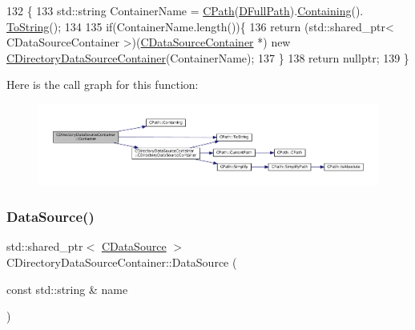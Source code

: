 \begin{DoxyCode}
132                                                                               \{
133     std::string ContainerName = \hyperlink{classCPath}{CPath}(\hyperlink{classCDirectoryDataSourceContainer_ac3d3c7e7d7bc9f68ba8a8747a3dee8b5}{DFullPath}).\hyperlink{classCPath_a24d8c455b1663ce251d3a749437fa4fe}{Containing}().
      \hyperlink{classCPath_abbafaf377a7e38e0151bd9567d526951}{ToString}();
134     
135     \textcolor{keywordflow}{if}(ContainerName.length())\{
136         \textcolor{keywordflow}{return} (std::shared\_ptr< CDataSourceContainer >)(\hyperlink{classCDataSourceContainer}{CDataSourceContainer} *) \textcolor{keyword}{new} 
      \hyperlink{classCDirectoryDataSourceContainer_a62ef6d44201c6be66421b6c247f3b3bf}{CDirectoryDataSourceContainer}(ContainerName);
137     \}
138     \textcolor{keywordflow}{return} \textcolor{keyword}{nullptr};
139 \}
\end{DoxyCode}
Here is the call graph for this function\+:
\nopagebreak
\begin{figure}[H]
\begin{center}
\leavevmode
\includegraphics[width=350pt]{classCDirectoryDataSourceContainer_a5a498db9b312c223b0816fc6cc1fcd3d_cgraph}
\end{center}
\end{figure}
\hypertarget{classCDirectoryDataSourceContainer_ac925eec9c2c71654d0012bff92a462d4}{}\label{classCDirectoryDataSourceContainer_ac925eec9c2c71654d0012bff92a462d4} 
\subsubsection{\texorpdfstring{Data\+Source()}{DataSource()}}
{\footnotesize\ttfamily std\+::shared\+\_\+ptr$<$ \hyperlink{classCDataSource}{C\+Data\+Source} $>$ C\+Directory\+Data\+Source\+Container\+::\+Data\+Source (\begin{DoxyParamCaption}\item[{const std\+::string \&}]{name }\end{DoxyParamCaption})\hspace{0.3cm}{\ttfamily [virtual]}}



